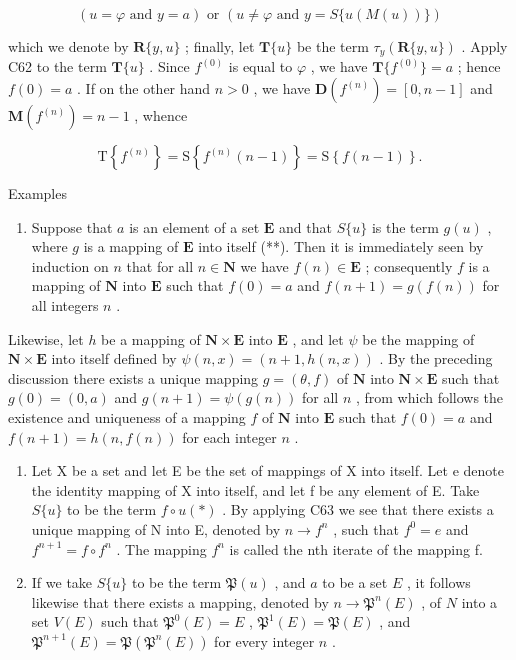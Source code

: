 \[
(u = \varphi \text {   and   } y = a) \text {   or   } (u \neq \varphi \text {   and   } y = S \{u (M (u)) \})
\]

which we denote by \(\mathbf{R}\{y,u\}\) ; finally, let \(\mathbf{T}\{u\}\) be the term \(\tau_{y}(\mathbf{R}\{y,u\})\) . Apply C62 to the term \(\mathbf{T}\{u\}\) . Since \(f^{(0)}\) is equal to \(\varphi\) , we have \(\mathbf{T}\{f^{(0)}\}=a\) ; hence \(f(0)=a\) . If on the other hand \(n>0\) , we have \(\mathbf{D}(f^{(n)})=[0,n-1]\) and \(\mathbf{M}(f^{(n)})=n-1\) , whence

\[
\mathrm{T} \left\{f ^ {(n)} \right\} = \mathrm{S} \left\{f ^ {(n)} (n - 1) \right\} = \mathrm{S} \left\{f (n - 1) \right\}.
\]

Examples

\begin{enumerate}
\def\labelenumi{(\arabic{enumi})}
\tightlist
\item
  Suppose that \(a\) is an element of a set \(\mathbf{E}\) and that \(S\{u\}\) is the term \(g(u)\) , where \(g\) is a mapping of \(\mathbf{E}\) into itself (**). Then it is immediately seen by induction on \(n\) that for all \(n \in \mathbf{N}\) we have \(f(n) \in \mathbf{E}\) ; consequently \(f\) is a mapping of \(\mathbf{N}\) into \(\mathbf{E}\) such that \(f(0) = a\) and \(f(n + 1) = g(f(n))\) for all integers \(n\) .
\end{enumerate}

Likewise, let \(h\) be a mapping of \(\mathbf{N} \times \mathbf{E}\) into \(\mathbf{E}\) , and let \(\psi\) be the mapping of \(\mathbf{N} \times \mathbf{E}\) into itself defined by \(\psi(n, x) = (n + 1, h(n, x))\) . By the preceding discussion there exists a unique mapping \(g = (\theta, f)\) of \(\mathbf{N}\) into \(\mathbf{N} \times \mathbf{E}\) such that \(g(0) = (0, a)\) and \(g(n + 1) = \psi(g(n))\) for all \(n\) , from which follows the existence and uniqueness of a mapping \(f\) of \(\mathbf{N}\) into \(\mathbf{E}\) such that \(f(0) = a\) and \(f(n + 1) = h(n, f(n))\) for each integer \(n\) .

\begin{enumerate}
\def\labelenumi{(\arabic{enumi})}
\setcounter{enumi}{1}
\item
  Let X be a set and let E be the set of mappings of X into itself. Let e denote the identity mapping of X into itself, and let f be any element of E. Take \(S\{u\}\) to be the term \(f \circ u (*)\) . By applying C63 we see that there exists a unique mapping of N into E, denoted by \(n \to f^n\) , such that \(f^0 = e\) and \(f^{n+1} = f \circ f^n\) . The mapping \(f^n\) is called the nth iterate of the mapping f.
\item
  If we take \(S \{u\}\) to be the term \(\mathfrak{P}(u)\) , and \(a\) to be a set \(E\) , it follows likewise that there exists a mapping, denoted by \(n \to \mathfrak{P}^n(E)\) , of \(N\) into a set \(V(E)\) such that \(\mathfrak{P}^0(E) = E\) , \(\mathfrak{P}^1(E) = \mathfrak{P}(E)\) , and \(\mathfrak{P}^{n+1}(E) = \mathfrak{P}(\mathfrak{P}^n(E))\) for every integer \(n\) .
\end{enumerate}

